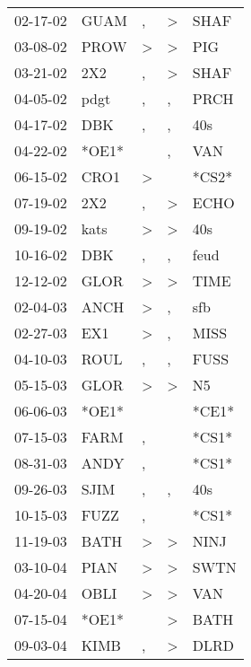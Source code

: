 \begin{supertabular}{lllll}
 02-17-02 &   GUAM &                , &  \textgreater &   SHAF \\
 03-08-02 &   PROW &     \textgreater &  \textgreater &    PIG \\
 03-21-02 &    2X2 &                , &  \textgreater &   SHAF \\
 04-05-02 &   pdgt &                , &             , &   PRCH \\
 04-17-02 &    DBK &                , &             , &    40s \\
 04-22-02 &  *OE1* &                  &             , &    VAN \\
 06-15-02 &   CRO1 &     \textgreater &               &  *CS2* \\
 07-19-02 &    2X2 &                , &  \textgreater &   ECHO \\
 09-19-02 &   kats &     \textgreater &  \textgreater &    40s \\
 10-16-02 &    DBK &                , &             , &   feud \\
 12-12-02 &   GLOR &     \textgreater &  \textgreater &   TIME \\
 02-04-03 &   ANCH &     \textgreater &             , &    sfb \\
 02-27-03 &    EX1 &     \textgreater &             , &   MISS \\
 04-10-03 &   ROUL &                , &             , &   FUSS \\
 05-15-03 &   GLOR &     \textgreater &  \textgreater &     N5 \\
 06-06-03 &  *OE1* &                  &               &  *CE1* \\
 07-15-03 &   FARM &                , &               &  *CS1* \\
 08-31-03 &   ANDY &                , &               &  *CS1* \\
 09-26-03 &   SJIM &                , &             , &    40s \\
 10-15-03 &   FUZZ &                , &               &  *CS1* \\
 11-19-03 &   BATH &     \textgreater &  \textgreater &   NINJ \\
 03-10-04 &   PIAN &     \textgreater &  \textgreater &   SWTN \\
 04-20-04 &   OBLI &     \textgreater &  \textgreater &    VAN \\
 07-15-04 &  *OE1* &                  &  \textgreater &   BATH \\
 09-03-04 &   KIMB &                , &  \textgreater &   DLRD \\

\end{supertabular}
